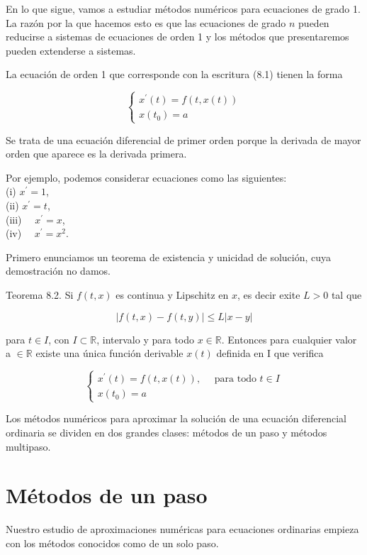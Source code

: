 \documentclass[10pt]{book}
\begin{document}
En lo que sigue, vamos a estudiar métodos numéricos para ecuaciones de grado 1. La razón por la que hacemos esto es que las ecuaciones de grado $n$ pueden reducirse a sistemas de ecuaciones de orden 1 y los métodos que presentaremos pueden extenderse a sistemas.

La ecuación de orden 1 que corresponde con la escritura (8.1) tienen la forma

\[
\left\{\begin{array}{l}
x^{\prime}(t)=f(t, x(t))  \tag{8.2}\\
x\left(t_{0}\right)=a
\end{array}\right.
\]

Se trata de una ecuación diferencial de primer orden porque la derivada de mayor orden que aparece es la derivada primera.

Por ejemplo, podemos considerar ecuaciones como las siguientes:\\
(i) $x^{\prime}=1$,\\
(ii) $x^{\prime}=t$,\\
(iii) $\quad x^{\prime}=x$,\\
(iv) $\quad x^{\prime}=x^{2}$.

Primero enunciamos un teorema de existencia y unicidad de solución, cuya demostración no damos.

Teorema 8.2. Si $f(t, x)$ es continua y Lipschitz en $x$, es decir exite $L>0$ tal que

$$
|f(t, x)-f(t, y)| \leq L|x-y|
$$

para $t \in I$, con $I \subset \mathbb{R}$, intervalo y para todo $x \in \mathbb{R}$. Entonces para cualquier valor a $\in \mathbb{R}$ existe una única función derivable $x(t)$ definida en I que verifica

$$
\left\{\begin{array}{l}
x^{\prime}(t)=f(t, x(t)), \quad \text { para todo } t \in I \\
x\left(t_{0}\right)=a
\end{array}\right.
$$

Los métodos numéricos para aproximar la solución de una ecuación diferencial ordinaria se dividen en dos grandes clases: métodos de un paso y métodos multipaso.

\section{Métodos de un paso}
Nuestro estudio de aproximaciones numéricas para ecuaciones ordinarias empieza con los métodos conocidos como de un solo paso.
\end{document}
